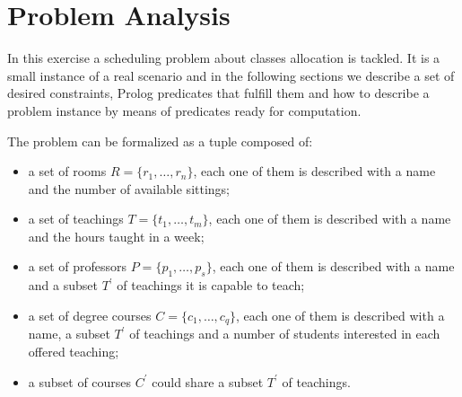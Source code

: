 \documentclass[10pt,a4paper]{article} %
\begin{document}
    \title{\rmfamily\normalfont{}}
    \author{}
    \date{\today}

    \maketitle

    \begin{abstract}
        This short document explains my work to support
        AI exam, taught by Prof. Paolo Frasconi at University of Florence,
        comments some results and shows how to reproduce test cases.
        A Prolog program has been implemented in order to  produce a scheduler
        for the problem at hand, satisfying the requested constraints.
    \end{abstract}


    \section{Problem Analysis}
    In this exercise a scheduling problem about classes allocation
    is tackled. It is a small instance of a real scenario
    and in the following sections we describe a set of desired constraints,
    Prolog predicates that fulfill them and how to describe a problem
    instance by means of predicates ready for computation.

    The problem can be formalized as a tuple composed of:
    \begin{itemize}
        \item a set of rooms $R = \lbrace r_1, \ldots, r_n \rbrace$, each
            one of them is described with a name and the number
            of available sittings;
        \item a set of teachings $T = \lbrace t_1, \ldots, t_m \rbrace$, each
            one of them is described with a name and the hours taught in a week;
        \item a set of professors $P = \lbrace p_1, \ldots, p_s \rbrace$, each
            one of them is described with a name and a subset $T^\prime$ of teachings
            it is capable to teach;
        \item a set of degree courses $C = \lbrace c_1, \ldots, c_q \rbrace$, each
            one of them is described with a name, a subset $T^\prime$ of teachings
            and a number of students interested in each offered teaching;
        \item a subset of courses $C^\prime$ could share a subset $T^\prime$ of teachings.
    \end{itemize}
\end{document}
